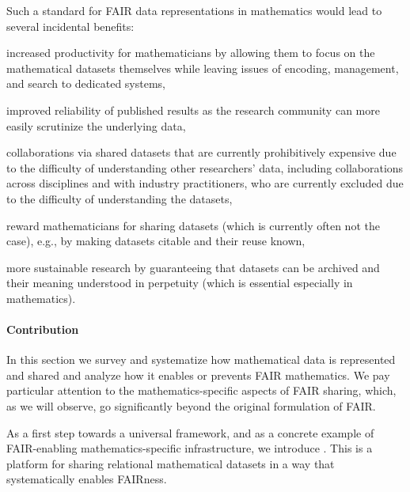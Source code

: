 Such a standard for FAIR data representations in mathematics would lead to several incidental benefits:
\begin{compactitem}
\item increased productivity for mathematicians by allowing them to focus on the mathematical datasets themselves while leaving issues of encoding, management, and search to dedicated systems,
\item improved reliability of published results as the research community can more easily scrutinize the underlying data,
\item collaborations via shared datasets that are currently prohibitively expensive due to the difficulty of understanding other researchers' data, including collaborations across disciplines and with industry practitioners, who are currently excluded due to the difficulty of understanding the datasets,
\item reward mathematicians for sharing datasets (which is currently often not the case), e.g., by making datasets citable and their reuse known,
\item more sustainable research by guaranteeing that datasets can be archived and their meaning understood in perpetuity (which is essential especially in mathematics).
\end{compactitem}

\paragraph{Contribution}
In this section we survey and systematize how mathematical data is represented and shared and analyze how it enables or prevents FAIR mathematics.
We pay particular attention to the mathematics-specific aspects of FAIR sharing, which, as we will observe, go significantly beyond the original formulation of FAIR.

As a first step towards a universal framework, and as a concrete example of FAIR-enabling mathematics-specific infrastructure, we introduce \dmh.
This is a platform for sharing relational mathematical datasets in a way that systematically enables FAIRness.

